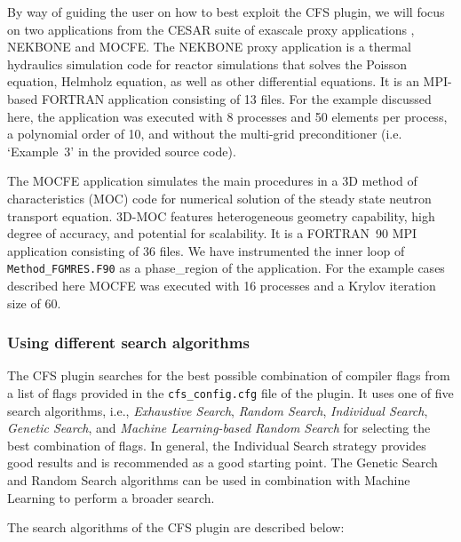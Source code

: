 
By way of guiding the user on how to best exploit the CFS plugin, we will focus on two applications from the CESAR suite of exascale proxy applications \cite{CESAR}, NEKBONE and MOCFE. The NEKBONE proxy application is a thermal hydraulics simulation code for  reactor simulations that solves the Poisson equation, Helmholz equation, as well as other differential equations. It is an MPI-based FORTRAN application consisting of 13 files. For the example discussed here, the application was executed with 8 processes and 50 elements per process, a polynomial order of 10, and without the multi-grid preconditioner (i.e. `Example~3' in the provided source code). 

The MOCFE application simulates the main procedures in a 3D method of characteristics (MOC) code for numerical solution of the steady state neutron transport equation.  3D-MOC features heterogeneous geometry capability, high degree of accuracy, and potential for scalability. It is a FORTRAN~90 MPI application consisting of 36 files. We have instrumented the inner loop of {\tt Method\_FGMRES.F90} as a phase\_region of the application. For the example cases described here MOCFE was executed with 16 processes and a Krylov iteration size of 60.


\subsubsection{Using different search algorithms}\label{sec:cfs-search}

The CFS plugin searches for the best possible combination of compiler flags from a list of flags provided in the \texttt{cfs\_config.cfg} file of the plugin. It uses one of five search algorithms, i.e., \textit{Exhaustive Search}, \textit{Random Search}, \textit{Individual Search}, \textit{Genetic Search}, and \textit{Machine Learning-based Random Search} for selecting the best combination of flags. In general, the Individual Search strategy provides good results and is recommended as a good starting point. The Genetic Search and Random Search algorithms can be used in combination with Machine Learning to perform a broader search.

The search algorithms of the CFS plugin are described below:

